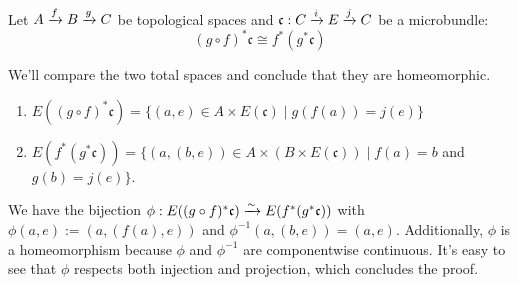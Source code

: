  \\
Let $A \xto{f} B \xto{g} C$ be topological spaces and $\mathfrak{c}: \bundle{C}{E}{i}{j}$ be a microbundle:
\[ (g \circ f)^*\mathfrak{c} \cong f^*(g^*\mathfrak{c}) \]
\begin{myproof}
We'll compare the two total spaces and conclude that they are homeomorphic.
\begin{enumerate}
    \item $E((g \circ f)^*\mathfrak{c}) = \{ (a, e) \in A \times E(\mathfrak{c}) \mid g(f(a)) = j(e)\}$ 
    \item $E(f^*(g^*\mathfrak{c})) = \{ (a, (b, e)) \in A \times (B \times E(\mathfrak{c})) \mid f(a) = b$ and $ g(b) = j(e) \}$.
\end{enumerate}
We have the bijection $\phi: E((g \circ f)^*\mathfrak{c}) \isomto E(f^*(g^*\mathfrak{c}))$ with $\phi(a, e) := (a, (f(a), e))$ and $\phi^{-1}(a, (b, e)) = (a, e)$.
Additionally, $\phi$ is a homeomorphism because $\phi$ and $\phi^{-1}$ are componentwise continuous.
It's easy to see that $\phi$ respects both injection and projection, which concludes the proof.
\end{myproof}